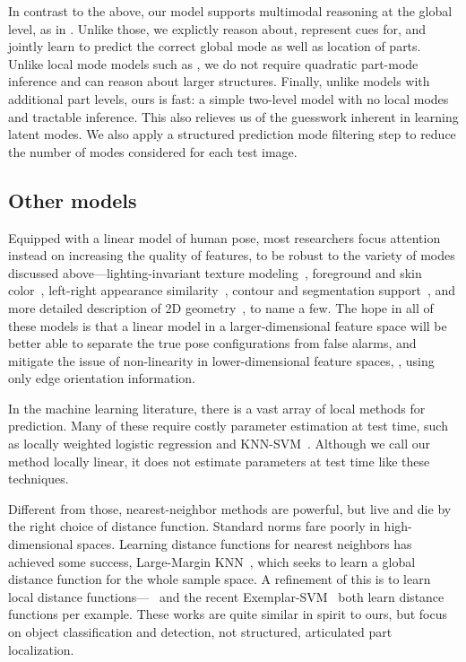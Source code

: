 In contrast to the above, our model supports multimodal reasoning at the global 
level, as in \citep{everingham2011,ramanan-faces,wang2008multiple}.  Unlike 
those, we explictly reason about, represent cues for, and jointly learn to 
predict the correct global mode as well as location of parts.  Unlike local mode models such as 
\citet{deva2011}, we do not require quadratic part-mode inference and can 
reason about larger structures.  Finally, unlike models with additional part 
levels, ours is fast: a simple two-level model with no local modes and 
tractable inference.  This also relieves us of the guesswork inherent in 
learning latent modes. We also apply a structured prediction mode filtering 
step to reduce the number of modes considered for each test image. 

\subsection{Other models}
 Equipped with a linear model of human 
pose, most researchers focus attention instead on increasing the quality of 
features, to be robust to the variety of modes discussed 
above---lighting-invariant texture modeling~\citep{andriluka09}, foreground and 
skin color~\citep{devacrf,eichner09}, left-right appearance 
similarity~\citep{ddtran,sapp2011}, contour and segmentation 
support~\citep{sapp2010cascades,sapp2011}, and more detailed description of 2D 
geometry~\citep{ddtran,sapp2011}, to name a few.  The hope in all of these 
models is that a linear model in a larger-dimensional feature space will be 
better able to separate the true pose configurations from false alarms, and 
mitigate the issue of non-linearity in lower-dimensional feature spaces, \eg, 
using only edge orientation information.

In the machine learning literature, there is a vast array of local methods for 
prediction.  Many of these require costly parameter estimation at test time, 
such as locally weighted logistic regression and KNN-SVM~\citep{zhang06}.  
Although we call our method locally linear, it does not estimate parameters at 
test time like these techniques.

Different from those, nearest-neighbor methods are powerful, but live and die 
by the right choice of distance function.  Standard norms fare poorly in 
high-dimensional spaces.  Learning distance functions for nearest neighbors has 
achieved some success, \eg Large-Margin KNN~\citep{lmknn}, which seeks to learn 
a global distance function for the whole sample space.  A refinement of this is 
to learn local distance functions---~\citep{frome07} and the recent 
Exemplar-SVM~\citep{esvm} both learn distance functions per example.  These 
works are quite similar in spirit to ours, but focus on object classification 
and detection, not structured, articulated part localization.


